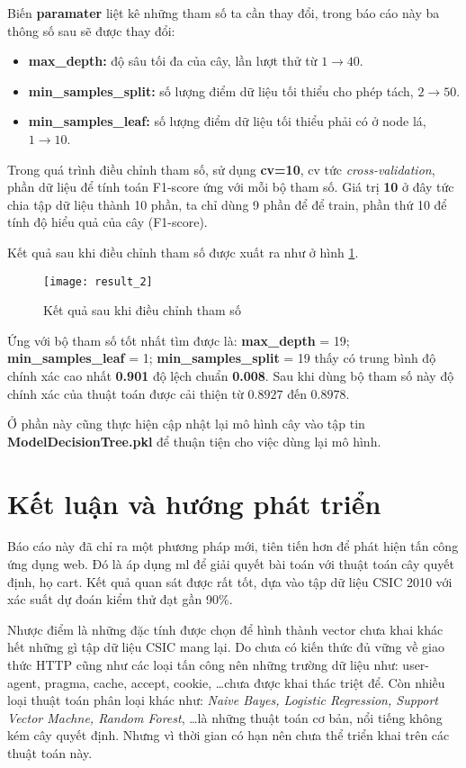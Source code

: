 \documentclass[../main-report.tex]{subfiles}
\begin{document}
Biến \textbf{paramater} liệt kê những tham số ta cần thay đổi, trong báo cáo này ba thông số sau sẽ được thay đổi:

\begin{itemize}
\item \textbf{max\_depth:} độ sâu tối đa của cây, lần lượt thử từ $1 \to 40$.
\item \textbf{min\_samples\_split:} số lượng điểm dữ liệu tối thiểu cho phép tách, $2 \to 50$.
\item \textbf{min\_samples\_leaf:} số lượng điểm dữ liệu tối thiểu phải có ở node lá, $1 \to 10$.
\end{itemize}

Trong quá trình điều chỉnh tham số, sử dụng \textbf{cv=10}, cv tức \emph{cross-validation}, phần dữ liệu để tính toán F1-score ứng với mỗi bộ tham số. Giá trị \textbf{10} ở đây tức chia tập dữ liệu thành 10 phần, ta chỉ dùng 9 phần để để train, phần thứ 10 để tính độ hiểu quả của cây (F1-score).

Kết quả sau khi điều chỉnh tham số được xuất ra như ở hình \ref{fig:result_2}.

\begin{figure}[ht!]
\centering\texttt{[image: result\_2]}
\caption{Kết quả sau khi điều chỉnh tham số}
\label{fig:result_2}
\end{figure}

Ứng với bộ tham số tốt nhất tìm được là: \textbf{max\_depth} = 19; \textbf{min\_samples\_leaf} = 1; \textbf{min\_samples\_split} = 19  thấy có trung bình độ chính xác cao nhất \textbf{0.901} độ lệch chuẩn \textbf{0.008}. Sau khi dùng bộ tham số này độ chính xác của thuật toán được cải thiện từ $0.8927$ đến $0.8978$.

Ở phần này cũng thực hiện cập nhật lại mô hình cây vào tập tin \textbf{ModelDecisionTree.pkl} để thuận tiện cho việc dùng lại mô hình.

\section{Kết luận và hướng phát triển}
Báo cáo này đã chỉ ra một phương pháp mới, tiên tiến hơn để phát hiện tấn công ứng dụng web. Đó là áp dụng \gls{ml} để giải quyết bài toán với thuật toán cây quyết định, họ \acrshort{cart}. Kết quả quan sát được rất tốt, dựa vào tập dữ liệu CSIC 2010 với xác suất dự đoán kiểm thử đạt gần 90\%.

Nhược điểm là những đặc tính được chọn để hình thành vector chưa khai khác hết những gì tập dữ liệu CSIC mang lại. Do chưa có kiến thức đủ vững về giao thức HTTP cũng như các loại tấn công nên những trường dữ liệu như: user-agent, pragma, cache, accept, cookie, \ldots chưa được khai thác triệt để. Còn nhiều loại thuật toán phân loại khác như: \emph{Naive Bayes, Logistic Regression, Support Vector Machne, Random Forest}, \ldots là những thuật toán cơ bản, nổi tiếng không kém cây quyết định. Nhưng vì thời gian có hạn nên chưa thể triển khai trên các thuật toán này.
\end{document}
